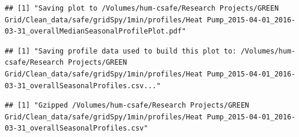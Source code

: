 \documentclass[]{article}
\begin{document}
\begin{verbatim}
## [1] "Saving plot to /Volumes/hum-csafe/Research Projects/GREEN Grid/Clean_data/safe/gridSpy/1min/profiles/Heat Pump_2015-04-01_2016-03-31_overallMedianSeasonalProfilePlot.pdf"
\end{verbatim}

\begin{verbatim}
## [1] "Saving profile data used to build this plot to: /Volumes/hum-csafe/Research Projects/GREEN Grid/Clean_data/safe/gridSpy/1min/profiles/Heat Pump_2015-04-01_2016-03-31_overallSeasonalProfiles.csv..."
\end{verbatim}

\begin{verbatim}
## [1] "Gzipped /Volumes/hum-csafe/Research Projects/GREEN Grid/Clean_data/safe/gridSpy/1min/profiles/Heat Pump_2015-04-01_2016-03-31_overallSeasonalProfiles.csv"
\end{verbatim}
\end{document}
